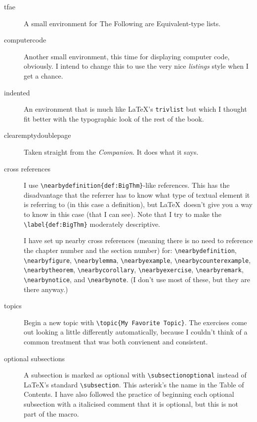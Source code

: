 \documentclass[titlepage]{article}
\makeatletter
\renewcommand{\subsection}{\@startsection{subsection}%
  {2}%
  {0em}%
  {3ex plus.25ex minus.25ex}%
  {.5ex plus .05ex minus .05ex}%
  {\large\bfseries\raggedright}}
\makeatother
\begin{document}
\begin{description}
  \item[tfae]
    A small environment for The Following are Equivalent-type lists.
 
  \item[computercode]
    Another small environment, this time for displaying computer code,
    obviously.
    I intend to change this to use the very nice \textit{listings} style
    when I get a chance.

  \item[indented] 
    An environment that is much like \LaTeX's \verb|trivlist| but which I
    thought fit better with the typographic look of the rest of the book.

  \item[clearemptydoublepage]
    Taken straight from the \textit{Companion}.
    It does what it says.

  \item[cross references]
    I use \verb!\nearbydefinition{def:BigThm}!-like references.
    This has the disadvantage that the referrer has to know what type
    of textual element it is referring to (in this case a definition),
    but \LaTeX\ doesn't give you a way to know in this case (that I can see).
    Note that I try to make the \verb!\label{def:BigThm}! moderately
    descriptive.

    I have set up nearby cross references (meaning there is no need
    to reference the chapter number and the section number) for:
    \verb!\nearbydefinition!, 
    \verb!\nearbyfigure!, 
    \verb!\nearbylemma!, 
    \verb!\nearbyexample!, 
    \verb!\nearbycounterexample!, 
    \verb!\nearbytheorem!, 
    \verb!\nearbycorollary!, 
    \verb!\nearbyexercise!, 
    \verb!\nearbyremark!, 
    \verb!\nearbynotice!, and 
    \verb!\nearbynote!.
    (I don't use most of these, but they are there anyway.)


  \item[topics]
   Begin a new
   topic with \verb|\topic{My Favorite Topic}|.
   The exercises come out looking a little differently automatically, 
   because I couldn't think of a common treatment that was both 
   convienent and consistent.

  \item[optional subsections]
    A subsection is marked as optional with \verb|\subsectionoptional|
    instead of \LaTeX's standard \verb|\subsection|.
    This asterisk's the name in the Table of Contents.
    I have also followed the practice of beginning each optional 
    subsection with a
    italicised comment that it is optional, but this is not part of the macro.



\end{description}
\end{document}
